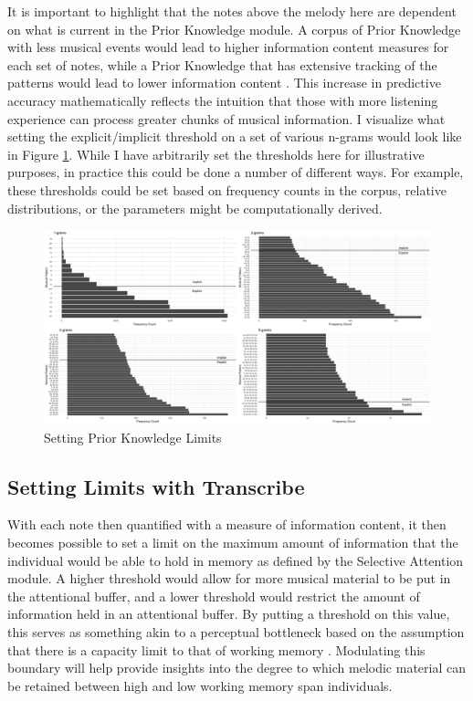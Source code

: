 \documentclass[12pt,]{book}
\begin{document}
It is important to highlight that the notes above the melody here are dependent on what is current in the Prior Knowledge module.
A corpus of Prior Knowledge with less musical events would lead to higher information content measures for each set of notes, while a Prior Knowledge that has extensive tracking of the patterns would lead to lower information content \citep{conklinMultipleViewpointSystems1995}.
This increase in predictive accuracy mathematically reflects the intuition that those with more listening experience can process greater chunks of musical information.
I visualize what setting the explicit/implicit threshold on a set of various n-grams would look like in Figure \ref{fig:thresholds}.
While I have arbitrarily set the thresholds here for illustrative purposes, in practice this could be done a number of different ways.
For example, these thresholds could be set based on frequency counts in the corpus, relative distributions, or the parameters might be computationally derived.

\begin{figure}

{\centering \includegraphics[width=1\linewidth]{img/pk_grampanel} 

}

\caption{Setting Prior Knowledge Limits}\label{fig:thresholds}
\end{figure}

\hypertarget{setting-limits-with-transcribe}{%
\subsection{Setting Limits with Transcribe}\label{setting-limits-with-transcribe}}

With each note then quantified with a measure of information content, it then becomes possible to set a limit on the maximum amount of information that the individual would be able to hold in memory as defined by the Selective Attention module.
A higher threshold would allow for more musical material to be put in the attentional buffer, and a lower threshold would restrict the amount of information held in an attentional buffer.
By putting a threshold on this value, this serves as something akin to a perceptual bottleneck based on the assumption that there is a capacity limit to that of working memory \citep{cowanEvolvingConceptionsMemory1988, cowanMagicalMysteryFour2010}.
Modulating this boundary will help provide insights into the degree to which melodic material can be retained between high and low working memory span individuals.
\end{document}
